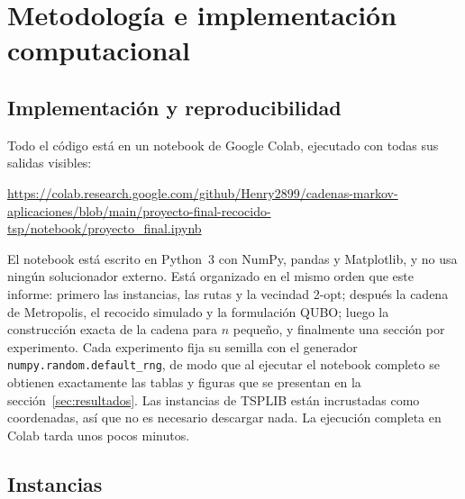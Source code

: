 
\section{Metodología e implementación computacional}
\label{sec:metodologia}

\algrenewcommand{}
\algrenewcommand{}
\algrenewcommand{}
\algrenewcommand{}
\algrenewcommand{}
\algrenewcommand{}
\algrenewcommand{}
\algrenewcommand{}

\subsection{Implementación y reproducibilidad}
\label{subsec:implementacion}

Todo el código está en un notebook de Google Colab, ejecutado con todas
sus salidas visibles:

\begin{center}
\small
\url{https://colab.research.google.com/github/Henry2899/cadenas-markov-aplicaciones/blob/main/proyecto-final-recocido-tsp/notebook/proyecto_final.ipynb}
\end{center}

El notebook está escrito en Python~3 con NumPy, pandas y Matplotlib, y
no usa ningún solucionador externo. Está organizado en el mismo orden que
este informe: primero las instancias, las rutas y la vecindad 2-opt;
después la cadena de Metropolis, el recocido simulado y la formulación
QUBO; luego la construcción exacta de la cadena para \(n\) pequeño, y
finalmente una sección por experimento. Cada experimento fija su
semilla con el generador \texttt{numpy.random.default\_rng}, de modo que
al ejecutar el notebook completo se obtienen exactamente las tablas y
figuras que se presentan en la sección~\ref{sec:resultados}. Las
instancias de TSPLIB están incrustadas como coordenadas, así que no es
necesario descargar nada. La ejecución completa en Colab tarda unos pocos
minutos.

\subsection{Instancias}
\label{subsec:instancias}

